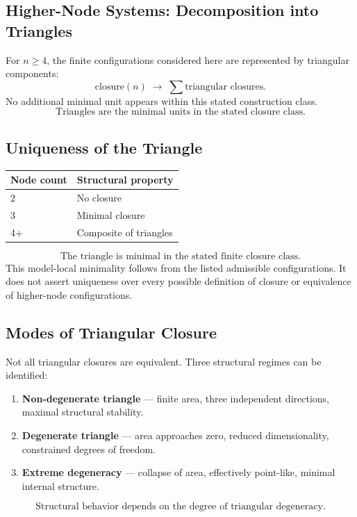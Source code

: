 \subsection{Higher-Node Systems: Decomposition into Triangles}

For $n \geq 4$, the finite configurations considered here are represented by
triangular components:
\begin{equation}
  \text{closure}(n) \;\longrightarrow\; \sum \text{triangular closures}.
\end{equation}
No additional minimal unit appears within this stated construction class.
\begin{equation}
  \boxed{\text{Triangles are the minimal units in the stated closure class.}}
\end{equation}

\subsection{Uniqueness of the Triangle}

\begin{center}
\begin{tabular}{ll}
\toprule
Node count & Structural property \\
\midrule
2   & No closure \\
3   & Minimal closure \\
4+  & Composite of triangles \\
\bottomrule
\end{tabular}
\end{center}
\begin{equation}
  \boxed{\text{The triangle is minimal in the stated finite closure class.}}
\end{equation}
This model-local minimality follows from the listed admissible configurations.
It does not assert uniqueness over every possible definition of closure or
equivalence of higher-node configurations.

\subsection{Modes of Triangular Closure}

Not all triangular closures are equivalent.
Three structural regimes can be identified:
\begin{enumerate}
  \item \textbf{Non-degenerate triangle} ---
        finite area, three independent directions, maximal structural stability.
  \item \textbf{Degenerate triangle} ---
        area approaches zero, reduced dimensionality,
        constrained degrees of freedom.
  \item \textbf{Extreme degeneracy} ---
        collapse of area, effectively point-like, minimal internal structure.
\end{enumerate}
\begin{equation}
  \boxed{\text{Structural behavior depends on the degree of triangular degeneracy.}}
\end{equation}

